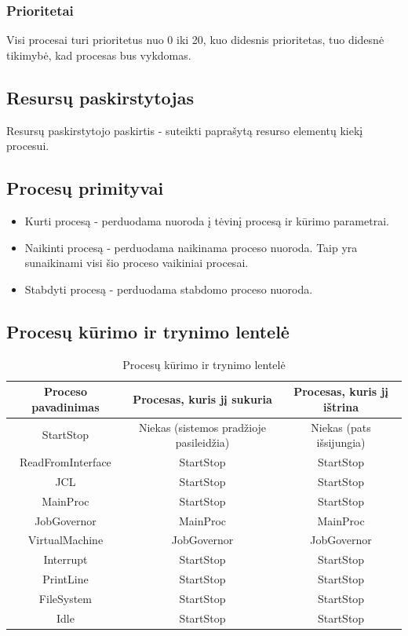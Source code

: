 \documentclass{VUMIFInfKursinis}
\begin{document}
\subsubsection{Prioritetai}

Visi procesai turi prioritetus nuo 0 iki 20, kuo didesnis prioritetas, tuo didesnė tikimybė, kad procesas bus vykdomas.

\subsection{Resursų paskirstytojas}

Resursų paskirstytojo paskirtis - suteikti paprašytą resurso elementų kiekį procesui.

\subsection{Procesų primityvai}

\begin{itemize}
	\item Kurti procesą - perduodama nuoroda į tėvinį procesą ir kūrimo parametrai.
	\item Naikinti procesą - perduodama naikinama proceso nuoroda. Taip yra sunaikinami visi šio proceso vaikiniai procesai.
	\item Stabdyti procesą - perduodama stabdomo proceso nuoroda.
\end{itemize}

\subsection{Procesų kūrimo ir trynimo lentelė}

\begin{table}[H]\footnotesize
	\centering
	\caption{Procesų kūrimo ir trynimo lentelė}    %
	\begin{tabular}{|c|c|c|}
		\hline
		Proceso pavadinimas & Procesas, kuris jį sukuria & Procesas, kuris jį ištrina \\
		\hline
		StartStop & Niekas (sistemos pradžioje pasileidžia) & Niekas (pats išsijungia) \\
		\hline
		ReadFromInterface & StartStop & StartStop\\
		\hline
		JCL & StartStop & StartStop \\
		\hline
		MainProc & StartStop & StartStop \\
		\hline
		JobGovernor & MainProc & MainProc \\
		\hline
		VirtualMachine & JobGovernor & JobGovernor \\
		\hline
		Interrupt & StartStop & StartStop \\
		\hline
		PrintLine & StartStop & StartStop \\
		\hline
		FileSystem & StartStop & StartStop \\
		\hline
		Idle & StartStop & StartStop \\
		\hline
	\end{tabular}
	\label{tab:duomenys}
\end{table}
\end{document}
